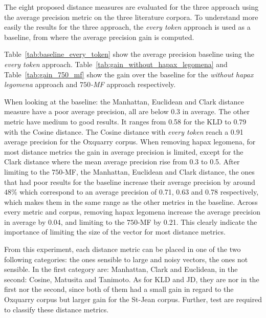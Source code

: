 The eight proposed distance measures are evaluated for the three approach using the average precision metric on the three literature corpora.
To understand more easily the results for the three approach, the \textit{every token} approach is used as a baseline, from where the average precision gain is computed.

Table~\ref{tab:baseline_every_token} show the average precision baseline using the \textit{every token} approach.
Table~\ref{tab:gain_without_hapax_legomena} and Table~\ref{tab:gain_750_mf} show the gain over the baseline for the \textit{without hapax legomena} approach and \textit{$750$-MF} approach respectively.

When looking at the baseline: the Manhattan, Euclidean and Clark distance measure have a poor average precision, all are below 0.3 in average.
The other metric have medium to good results.
It ranges from 0.58 for the KLD to 0.79 with the Cosine distance.
The Cosine distance with \textit{every token} reach a 0.91 average precision for the Oxquarry corpus.
When removing hapax legomena, for most distance metrics the gain in average precision is limited, except for the Clark distance where the mean average precision rise from 0.3 to 0.5.
After limiting to the $750$-MF, the Manhattan, Euclidean and Clark distance, the ones that had poor results for the baseline increase their average precision by around $48\%$ which correspond to an average precision of 0.71, 0.63 and 0.78 respectively, which makes them in the same range as the other metrics in the baseline.
Across every metric and corpus, removing hapax legomena increase the average precision in average by 0.04, and limiting to the $750$-MF by 0.21.
This clearly indicate the importance of limiting the size of the vector for most distance metrics.

From this experiment, each distance metric can be placed in one of the two following categories: the ones sensible to large and noisy vectors, the ones not sensible.
In the first category are: Manhattan, Clark and Euclidean, in the second: Cosine, Matusita and Tanimoto.
As for KLD and JD, they are nor in the first nor the second, since both of them had a small gain in regard to the Oxquarry corpus but larger gain for the St-Jean corpus.
Further, test are required to classify these distance metrics.

